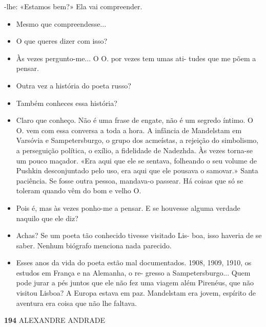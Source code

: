 -lhe: «Estamos bem?» Ela vai compreender.

\begin{itemize}
\tightlist
\item
  Mesmo que compreendesse...
\item
  O que queres dizer com isso?
\item
  Às vezes pergunto-me... O O. por vezes tem umas ati- tudes que me põem
  a pensar.
\item
  Outra vez a história do poeta russo?
\item
  Também conheces essa história?
\item
  Claro que conheço. Não é uma frase de engate, não é um segredo íntimo.
  O O. vem com essa conversa a toda a hora. A infância de Mandelstam em
  Varsóvia e Sampetersburgo, o grupo dos acmeístas, a rejeição do
  simbolismo, a perseguição política, o exílio, a fidelidade de
  Nadezhda. Às vezes torna-se um pouco maçador. «Era aqui que ele se
  sentava, folheando o seu volume de Pushkin desconjuntado pelo uso, era
  aqui que ele pousava o samovar.» Santa paciência. Se fosse outra
  pessoa, mandava-o passear. Há coisas que só se toleram quando vêm do
  bom e velho O.
\item
  Pois é, mas às vezes ponho-me a pensar. E se houvesse alguma verdade
  naquilo que ele diz?
\item
  Achas? Se um poeta tão conhecido tivesse visitado Lis- boa, isso
  haveria de se saber. Nenhum biógrafo menciona nada parecido.
\item
  Esses anos da vida do poeta estão mal documentados. 1908, 1909, 1910,
  os estudos em França e na Alemanha, o re- gresso a Sampetersburgo...
  Quem pode jurar a pés juntos que ele não fez uma viagem além Pirenéus,
  que não visitou Lisboa? A Europa estava em paz. Mandelstam era jovem,
  espírito de aventura era coisa que não lhe faltava.
\end{itemize}

\textbf{194 }ALEXANDRE ANDRADE

